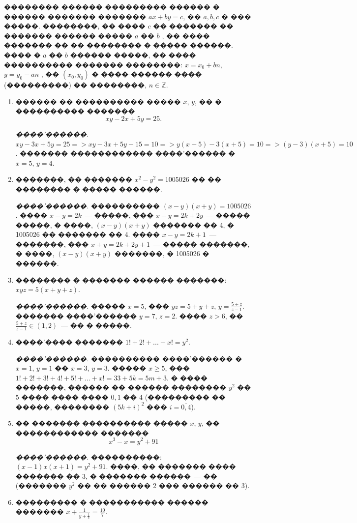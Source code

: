 \documentclass[a4paper,12pt]{article}
\begin{document}
�������� ������ ��������� ������ � ������ ������� ������� $ax + by = c$, �� $a ,b , c$ � ��� �����. ��������, �� ���� $c$ �� ������� �� ������� ������ ����� $a$ �� $b$ , �� ���� ������� �� �� �������� � ����� ������. ���� � $a$ �� $b$ ������ �����, �� ���� ���������� ������� ��������: $x = x_{0} + bn $, $y = y_{0} - an$ , �� $(x_{0},y_{0})$ � ����-������ ���� (���������) �� ��������, $n\in \mathbb{Z}$.

\medskip\medskip\medskip

\begin{enumerate}
\item ������ �� ���������� ����� $x$, $y$, �� � ���������� ������� $$xy-2x+5y=25.$$

\textit{����'������.} $xy-3x+5y=25 => xy-3x+5y-15=10 => y(x+5)-3(x+5)=10 => (y-3)(x+5)=10$. ������� ������������ ����'������ � $x=5$, $y=4$.

\item �������, �� ������� $x^{2}-y^{2}=1005026$ �� �� �������� � ����� ������.

\textit{����'������.} ���������� $(x-y)(x+y)=1005026$. ���� $x-y=2k$~--- �����, ��� $x+y=2k+2y$~--- ����� �����, � ����, $(x-y)(x+y)$ ������� �� 4, � 1005026 �� ������� �� 4. ���� $x-y=2k+1$~--- �������, ��� $x+y=2k+2y+1$~--- ����� �������, � ����, $(x-y)(x+y)$ �������, � 1005026 � ������.

\item �������� � ������� ������ �������: $xyz = 5(x+y+z)$.

\textit{����'������.} ����� $x=5$, ��� $yz = 5+y+z$, $y=\frac{5+z}{z-1}$. ������� ����'������ $y=7$, $z=2$. ���� $z>6$, �� $\frac{5+z}{z-1}\in (1,2)$~--- �� � �����.

\item ����'���� ������� $1!+2!+...+x!=y^{2}$.

\textit{����'������.} ���������� ����'������ � $x=1$, $y=1$ �� $x=3$, $y=3$. ����� $x\geq 5$, ��� $1!+2!+3!+4!+5!+...+x!=33+5k=5m+3$. � ���� �������, ������ �� ������ �������� $y^{2}$ �� $5$ ���� ���� ���� $0,1$ �� $4$ (��������� �� �����, �������� $(5k+i)^{2}$ ��� $i=\overline{0,4}$).

\item �� ������� ���������� ����� $x$, $y$, �� ������������ ������� $$x^{3}-x = y^{2}+91$$

\textit{����'������.} ����������: $(x-1)x(x+1)=y^{2}+91$. ����, �� ������� ���� ������� �� 3, � ������� ������~--- �� (������� $y^{2}$ �� �� ������ 2 ��� ������ �� 3).

\item ��������� � ����������� ������ ������� $x+\frac{1}{y+\frac{1}{z}}=\frac{10}{7}.$


\end{enumerate}
\end{document}
